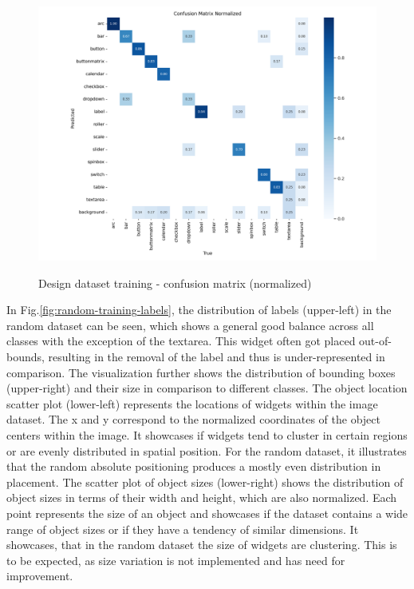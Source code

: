 \documentclass[Bachelor, BIC, english, fhCitStyle, IEEE]{BASE/twbook} %
\begin{document}
\begin{figure}[H]
    \caption{Design dataset training - confusion matrix (normalized)}
    \centering
    \includegraphics[width=\textwidth]{PICs/train373/confusion_matrix_normalized.png}
    \label{fig:design-training-confusion}
\end{figure}
\noindent
In Fig.\ref{fig:random-training-labels}, the distribution of labels (upper-left) in the random dataset can be seen, which shows a general good balance across all classes with the exception of the textarea. This widget often got placed out-of-bounds, resulting in the removal of the label and thus is under-represented in comparison. The visualization further shows the distribution of bounding boxes (upper-right) and their size in comparison to different classes. The object location scatter plot (lower-left) represents the locations of widgets within the image dataset. The x and y correspond to the normalized coordinates of the object centers within the image. It showcases if widgets tend to cluster in certain regions or are evenly distributed in spatial position. For the random dataset, it illustrates that the random absolute positioning produces a mostly even distribution in placement. The scatter plot of object sizes (lower-right) shows the distribution of object sizes in terms of their width and height, which are also normalized. Each point represents the size of an object and showcases if the dataset contains a wide range of object sizes or if they have a tendency of similar dimensions. It showcases, that in the random dataset the size of widgets are clustering. This is to be expected, as size variation is not implemented and has need for improvement.
\end{document}

